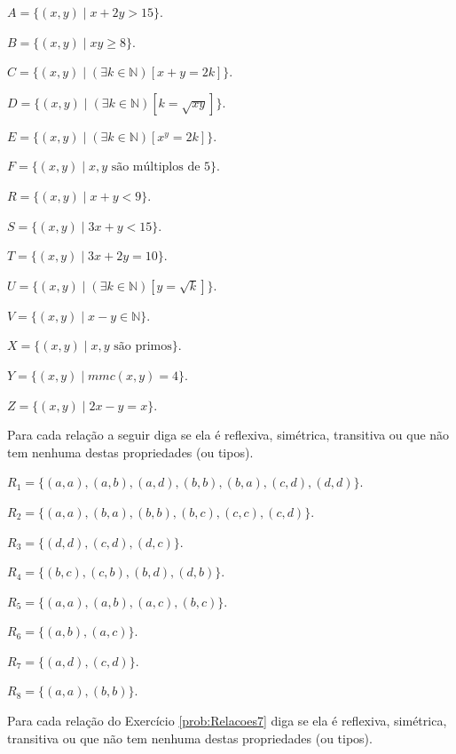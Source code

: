 \begin{exerList}
	\item $A = \{(x, y) \mid x + 2y > 15\}$.
	\item $B = \{(x, y) \mid xy \geq 8 \}$.
	\item $C = \{(x, y) \mid (\exists k \in \mathbb{N})[x+y = 2k]\}$.
	\item $D = \{(x, y) \mid (\exists k \in \mathbb{N})[k = \sqrt{xy}]\}$.
	\item $E = \{(x, y) \mid (\exists k \in \mathbb{N})[x^y = 2k]\}$.
	\item $F = \{(x, y) \mid x, y \text{ são múltiplos de } 5\}$.
	\item $R = \{(x, y) \mid x + y < 9\}$.
	\item $S = \{(x, y) \mid 3x + y < 15\}$.
	\item $T = \{(x, y) \mid 3x + 2y = 10\}$.
	\item $U = \{(x, y) \mid (\exists k \in \mathbb{N})[y = \sqrt{k}]\}$.
	\item $V = \{(x, y) \mid x - y \in \mathbb{N}\}$.
	\item $X = \{(x, y) \mid x, y \text{ são primos}\}$.
	\item $Y = \{(x, y) \mid mmc(x, y) = 4\}$.
	\item $Z = \{(x, y) \mid 2x - y = x\}$.
\end{exerList}

\begin{questao}\label{prob:Relacoes8}
	Para cada relação a seguir diga se ela é reflexiva, simétrica, transitiva ou que não tem nenhuma destas propriedades (ou tipos).
\end{questao}

\begin{exerList}
	\item $R_1 = \{(a,a),(a,b),(a,d),(b,b),(b,a),(c,d),(d,d)\}$.
	\item $R_2 = \{(a, a), (b, a), (b, b), (b, c), (c, c), (c, d)\}$.
	\item $R_3 = \{(d, d), (c, d), (d, c)\}$.
	\item $R_4 = \{(b, c), (c, b), (b, d), (d, b)\}$.
	\item $R_5 = \{(a,a),(a,b),(a,c),(b,c)\}$.
	\item $R_6 = \{(a,b),(a,c)\}$.
	\item $R_7 = \{(a,d),(c,d)\}$.
	\item $R_8 = \{(a,a),(b,b)\}$.
\end{exerList}

\begin{questao}\label{prob:Relacoes9}
	Para cada relação do Exercício \ref{prob:Relacoes7} diga se ela é reflexiva, simétrica, transitiva ou que não tem nenhuma destas propriedades (ou tipos).
\end{questao}

